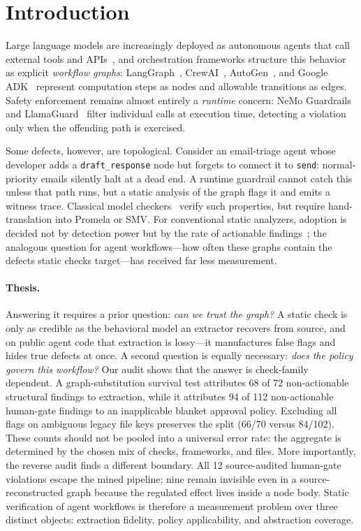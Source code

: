 \section{Introduction}
\label{sec:introduction}

Large language models are increasingly deployed as autonomous agents that call
external tools and APIs~\citep{schick2024toolformer, yao2023react}, and
orchestration frameworks structure this behavior as explicit \emph{workflow
graphs}: LangGraph~\citep{langgraph_docs}, CrewAI~\citep{crewai_docs},
AutoGen~\citep{wu2023autogen}, and Google ADK~\citep{google_adk_docs} represent
computation steps as nodes and allowable transitions as edges. Safety
enforcement remains almost entirely a \emph{runtime} concern: NeMo
Guardrails~\citep{nemo_guardrails} and LlamaGuard~\citep{llamaguard} filter
individual calls at execution time, detecting a violation only when the
offending path is exercised.

Some defects, however, are topological. Consider an email-triage agent whose
developer adds a \texttt{draft\_response} node but forgets to connect it to
\texttt{send}: normal-priority emails silently halt at a dead end. A runtime
guardrail cannot catch this unless that path runs, but a static analysis of the
graph flags it and emits a witness trace. Classical model
checkers~\citep{clarke1999modelchecking, holzmann1997spin, cimatti2002nusmv}
verify such properties, but require hand-translation into Promela or SMV. For
conventional static analyzers, adoption is decided not by detection power but by
the rate of actionable findings~\citep{bessey2010coverity, johnson2013static,
sadowski2018lessons}; the analogous question for agent workflows---how often
these graphs contain the defects static checks target---has received far less
measurement.

\paragraph{Thesis.}
Answering it requires a prior question: \emph{can we trust the graph?} A static
check is only as credible as the behavioral model an extractor recovers from
source, and on public agent code that extraction is lossy---it manufactures
false flags and hides true defects at once. A second question is equally
necessary: \emph{does the policy govern this workflow?} Our audit shows that
the answer is check-family dependent. A graph-substitution survival test
attributes 68 of 72 non-actionable structural findings to extraction, while it
attributes 94 of 112 non-actionable human-gate findings to an inapplicable
blanket approval policy. Excluding all flags on ambiguous legacy file keys
preserves the split (66/70 versus 84/102). These counts should not be pooled into a universal error rate: the
aggregate is determined by the chosen mix of checks, frameworks, and files.
More importantly, the reverse audit finds a different boundary. All 12
source-audited human-gate violations escape the mined pipeline; nine remain
invisible even in a source-reconstructed graph because the regulated effect
lives inside a node body. Static verification of agent workflows is therefore a
measurement problem over three distinct objects: extraction fidelity, policy
applicability, and abstraction coverage.

